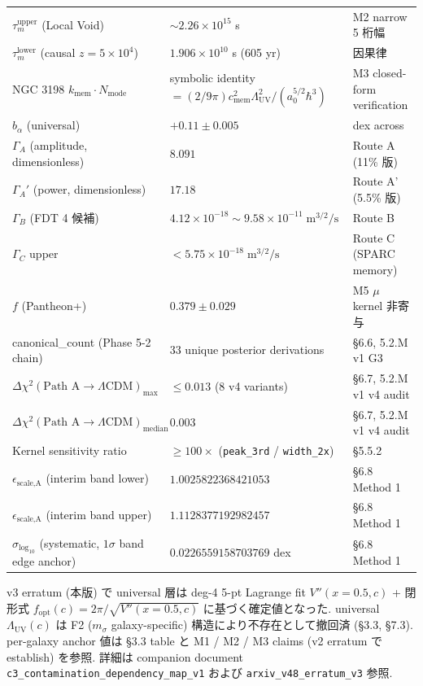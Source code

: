 \documentclass[11pt,a4paper]{ltjsarticle}
\newcommand{\kmem}{k_{\mathrm{mem}}}
\newcommand{\cmem}{c_{\mathrm{mem}}}
\newcommand{\Nmode}{N_{\mathrm{mode}}}
\newcommand{\taum}{\tau_{m}}
\newcommand{\bal}{b_{\alpha}}
\newcommand{\Lambdauv}{\Lambda_{\mathrm{UV}}}
\newcommand{\GammaA}{\Gamma_{A}}
\newcommand{\GammaAp}{\Gamma_{A}'}
\newcommand{\GammaB}{\Gamma_{B}}
\newcommand{\GammaC}{\Gamma_{C}}
\newcommand{\msigma}{m_{\sigma}}
\newcommand{\fopt}{f_{\mathrm{opt}}}
\begin{document}
\begin{center}
\begin{longtable}{@{}>{\raggedright\arraybackslash}p{43mm}>{\raggedright\arraybackslash}p{53mm}>{\raggedright\arraybackslash}p{60mm}@{}}
$\taum^{\mathrm{upper}}$ (Local Void) & $\sim 2.26 \times 10^{15}$ s & M2 narrow 5 桁幅 \\
$\taum^{\mathrm{lower}}$ (causal $z = 5 \times 10^4$) & $1.906 \times 10^{10}$ s (605 yr) & 因果律 \\
NGC 3198 $\kmem \cdot \Nmode$ & symbolic identity $= (2/9\pi) \cmem^2 \Lambdauv^2 /(a_0^{5/2}\hbar^3)$ & M3 closed-form verification \\
$\bal$ (universal) & $+0.11 \pm 0.005$ & 3.92 dex across \\
$\GammaA$ (amplitude, dimensionless) & $8.091$ & Route A (11\% 版) \\
$\GammaAp$ (power, dimensionless) & $17.18$ & Route A' (5.5\% 版) \\
$\GammaB$ (FDT 4 候補) & $4.12 \times 10^{-18}\sim 9.58 \times 10^{-11}\;\mathrm{m}^{3/2}/\mathrm{s}$ & Route B \\
$\GammaC$ upper & $< 5.75 \times 10^{-18}\;\mathrm{m}^{3/2}/\mathrm{s}$ & Route C (SPARC memory) \\
$f$ (Pantheon+) & $0.379 \pm 0.029$ & M5 $\mu$ kernel 非寄与 \\
canonical\_count (Phase 5-2 chain) & $33$ unique posterior derivations & \S 6.6, 5.2.M v1 G3 \\
$\Delta\chi^2(\text{Path A} \to \Lambda\text{CDM})_{\max}$ & $\leq 0.013$ (8 v4 variants) & \S 6.7, 5.2.M v1 v4 audit \\
$\Delta\chi^2(\text{Path A} \to \Lambda\text{CDM})_{\text{median}}$ & $0.003$ & \S 6.7, 5.2.M v1 v4 audit \\
Kernel sensitivity ratio & $\geq 100\times$ (\texttt{peak\_3rd} / \texttt{width\_2x}) & \S 5.5.2 \\
$\epsilon_{\text{scale,A}}$ (interim band lower) & $1.0025822368421053$ & \S 6.8 Method 1 \\
$\epsilon_{\text{scale,A}}$ (interim band upper) & $1.1128377192982457$ & \S 6.8 Method 1 \\
$\sigma_{\log_{10}}$ (systematic, $1\sigma$ band edge anchor) & $0.0226559158703769$ dex & \S 6.8 Method 1 \\
\bottomrule
\end{longtable}
\end{center}

\footnotesize\noindent
v3 erratum (本版) で universal 層は deg-4 5-pt Lagrange fit $V''(x=0.5, c)$ + 閉形式
$\fopt(c) = 2\pi/\sqrt{V''(x=0.5, c)}$ に基づく確定値となった. universal $\Lambdauv(c)$ は F2
($\msigma$ galaxy-specific) 構造により不存在として撤回済 (\S 3.3, \S 7.3). per-galaxy anchor 値は
\S 3.3 table と M1 / M2 / M3 claims (v2 erratum で establish) を参照. 詳細は companion document
\texttt{c3\_contamination\_dependency\_map\_v1} および \texttt{arxiv\_v48\_erratum\_v3} 参照.
\normalsize
\end{document}
